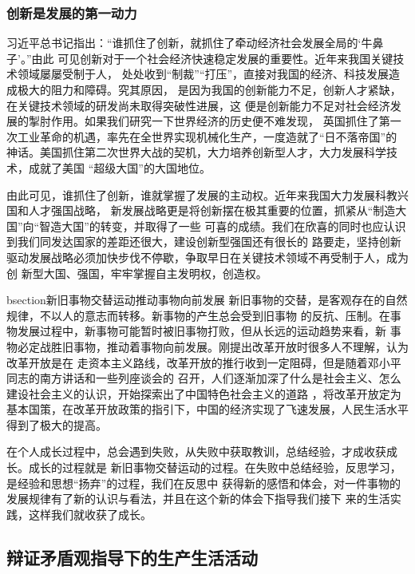 \documentclass{article}
\begin{document}
        \subsubsection{创新是发展的第一动力}
        习近平总书记指出：“谁抓住了创新，就抓住了牵动经济社会发展全局的‘牛鼻子’。”由此
        可见创新对于一个社会经济快速稳定发展的重要性。近年来我国关键技术领域屡屡受制于人，
        处处收到“制裁”“打压”，直接对我国的经济、科技发展造成极大的阻力和障碍。究其原因，
        是因为我国的创新能力不足，创新人才紧缺，在关键技术领域的研发尚未取得突破性进展，这
        便是创新能力不足对社会经济发展的掣肘作用。如果我们研究一下世界经济的历史便不难发现，
        英国抓住了第一次工业革命的机遇，率先在全世界实现机械化生产，一度造就了“日不落帝国”的
        神话。美国抓住第二次世界大战的契机，大力培养创新型人才，大力发展科学技术，成就了美国
        “超级大国”的大国地位。\par
        由此可见，谁抓住了创新，谁就掌握了发展的主动权。近年来我国大力发展科教兴国和人才强国战略，
        新发展战略更是将创新摆在极其重要的位置，抓紧从“制造大国”向“智造大国”的转变，并取得了一些
        可喜的成绩。我们在欣喜的同时也应认识到我们同发达国家的差距还很大，建设创新型强国还有很长的
        路要走，坚持创新驱动发展战略必须加快步伐不停歇，争取早日在关键技术领域不再受制于人，成为创
        新型大国、强国，牢牢掌握自主发明权，创造权。\par
        bsection{新旧事物交替运动推动事物向前发展}
        新旧事物的交替，是客观存在的自然规律，不以人的意志而转移。新事物的产生总会受到旧事物
        的反抗、压制。在事物发展过程中，新事物可能暂时被旧事物打败，但从长远的运动趋势来看，新
        事物必定战胜旧事物，推动着事物向前发展。刚提出改革开放时很多人不理解，认为改革开放是在
        走资本主义路线，改革开放的推行收到一定阻碍，但是随着邓小平同志的南方讲话和一些列座谈会的
        召开，人们逐渐加深了什么是社会主义、怎么建设社会主义的认识，开始探索出了中国特色社会主义的道路
        ，将改革开放定为基本国策，在改革开放政策的指引下，中国的经济实现了飞速发展，人民生活水平
        得到了极大的提高。\par
        在个人成长过程中，总会遇到失败，从失败中获取教训，总结经验，才成收获成长。成长的过程就是
        新旧事物交替运动的过程。在失败中总结经验，反思学习，是经验和思想“扬弃”的过程，我们在反思中
        获得新的感悟和体会，对一件事物的发展规律有了新的认识与看法，并且在这个新的体会下指导我们接下
        来的生活实践，这样我们就收获了成长。\par
    \subsection{辩证矛盾观指导下的生产生活活动}
\end{document}
